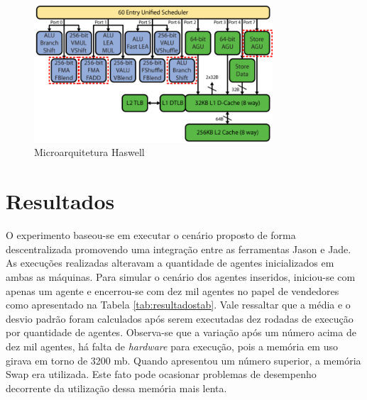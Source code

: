 \documentclass[conference]{IEEEtran}
\begin{document}
        \begin{figure}[ht]
        \centering
        \includegraphics[width=3.5in]{haswell.png}
        \caption{Microarquitetura Haswell}
        \label{hm}
        \end{figure}
        
                \section{Resultados}
        
        O experimento baseou-se em executar o cenário proposto de forma descentralizada promovendo uma integração entre as ferramentas Jason e Jade. As execuções realizadas alteravam a quantidade de agentes inicializados em ambas as máquinas. Para simular o cenário dos agentes inseridos, iniciou-se com apenas um agente e encerrou-se com dez mil agentes no papel de vendedores como apresentado na Tabela \ref{tab:resultadostab}. Vale ressaltar que a média e o desvio padrão foram calculados após serem executadas dez rodadas de execução por quantidade de agentes. Observa-se que a variação após um número acima de dez mil agentes, há falta de \textit{hardware} para execução, pois a memória em uso girava em torno de 3200 mb. Quando apresentou um número superior, a memória Swap era utilizada. Este fato pode ocasionar problemas de desempenho decorrente da utilização dessa memória mais lenta.
        
\end{document}
